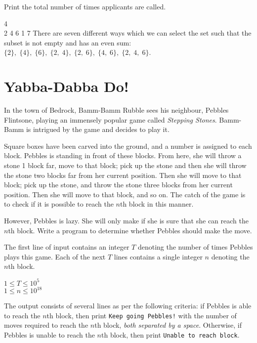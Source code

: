 \documentclass{problem-set}
\begin{document}
\outputformat
Print the total number of times applicants are called.

\pushnewpage

\addsampleExplanation
{
4\\
2 4 6 1
}
{
7
}
{
There are seven different ways which we can select the set such that the subset is not empty and has an even sum: $\{2\},\;\{4\},\;\{6\},\;\{2,\;4\},\;\{2,\;6\},\;\{4,\;6\},\;\{2,\;4,\;6\}$.
}


\newpage
\section{Yabba-Dabba Do!}
In the town of Bedrock, Bamm-Bamm Rubble sees his neighbour, Pebbles Flintsone, playing an immensely popular game called \textit{Stepping Stones}. Bamm-Bamm is intrigued by the game and decides to play it.

Square boxes have been carved into the ground, and a number is assigned to each block. Pebbles is standing in front of these blocks. From here, she will throw a stone 1 block far, move to that block; pick up the stone and then she will throw the stone two blocks far from her current position. Then she will move to that block; pick up the stone, and throw the stone three blocks from her current position. Then she will move to that block, and so on. The catch of the game is to check if it is possible to reach the $n$th block in this manner.

However, Pebbles is lazy. She will only make if she is sure that she can reach the $n$th block. Write a program to determine whether Pebbles should make the move.

The first line of input contains an integer $T$ denoting the number of times Pebbles plays this game. Each of the next $T$ lines contains a single integer $n$ denoting the $n$th block.

\constraints
$1 \leq T \leq 10^5$\\
$1 \leq n \leq 10^{18}$

\outputformat
The output consists of several lines as per the following criteria: if Pebbles is able to reach the $n$th block, then print \texttt{Keep going Pebbles!} with the number of moves required to reach the $n$th block, \textit{both separated by a space}. Otherwise, if Pebbles is unable to reach the $n$th block, then print \texttt{Unable to reach block}.

\pushnewpage

\end{document}
